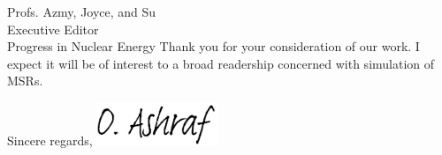 \documentclass[10.75pt]{letter} %
\newcommand{\RecipientName}{Profs. Azmy, Joyce, and Su\xspace}
\newcommand{\RecipientAddress}{Executive Editor\\Progress in Nuclear Energy}
\begin{document}
\begin{letter}{\RecipientName\\
			\RecipientAddress\xspace}
		Thank you for your consideration of our work. I expect it will be of interest
		to a broad readership concerned with simulation of MSRs.\\
		
		
		\closing{Sincere regards,
			\includegraphics[height=1.3cm]{signature.png}\\
		}
		
		
	\end{letter}
	
\end{document}

